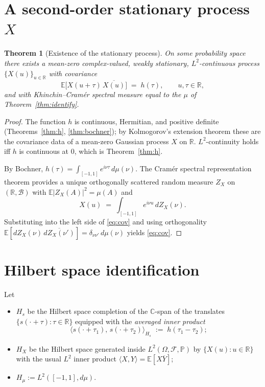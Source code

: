 \documentclass[11pt]{article}
\newtheorem{theorem}{Theorem}
\theoremstyle{definition}
\begin{document}
\section{A second-order stationary process $X$}\label{sec:X}

\begin{theorem}[Existence of the stationary process]\label{thm:X}
On some probability space there exists a mean-zero complex-valued,
weakly stationary, $L^{2}$-continuous process $\{X(u)\}_{u\in\mathbb{R}}$
with covariance
\begin{equation}\label{eq:cov}
\mathbb{E}\bigl[X(u+\tau)\,\overline{X(u)}\bigr] \;=\; h(\tau),
\qquad u,\tau\in\mathbb{R},
\end{equation}
and with Khinchin--Cramér spectral measure equal to the $\mu$ of
Theorem~\ref{thm:identify}.
\end{theorem}

\begin{proof}
The function $h$ is continuous, Hermitian, and positive definite
(Theorems~\ref{thm:h}, \ref{thm:bochner}); by Kolmogorov's extension
theorem these are the covariance data of a mean-zero Gaussian process
$X$ on $\mathbb{R}$. $L^{2}$-continuity holds iff $h$ is continuous at
$0$, which is Theorem~\ref{thm:h}.

By Bochner,
$h(\tau)=\int_{[-1,1]}e^{i\nu\tau}\,d\mu(\nu)$. The Cramér spectral
representation theorem provides a unique orthogonally scattered random
measure $Z_{X}$ on $(\mathbb{R},\mathcal{B})$ with
$\mathbb{E}|Z_{X}(A)|^{2}=\mu(A)$ and
\begin{equation}\label{eq:cramer}
X(u)\;=\;\int_{[-1,1]}e^{i\nu u}\,dZ_{X}(\nu).
\end{equation}
Substituting into the left side of \eqref{eq:cov} and using
orthogonality $\mathbb{E}[dZ_{X}(\nu)\,\overline{dZ_{X}(\nu')}]=\delta_{\nu\nu'}\,d\mu(\nu)$
yields \eqref{eq:cov}.
\end{proof}

\section{Hilbert space identification}\label{sec:hilbert}

Let
\begin{itemize}[leftmargin=1.6em]
\item $H_{s}$ be the Hilbert space completion of the $\mathbb{C}$-span of
the translates $\{s(\cdot+\tau):\tau\in\mathbb{R}\}$ equipped with the
\emph{averaged inner product}
\begin{equation}\label{eq:avginner}
\bigl\langle s(\cdot+\tau_{1}),\,s(\cdot+\tau_{2})\bigr\rangle_{H_{s}}
\;:=\; h(\tau_{1}-\tau_{2});
\end{equation}
\item $H_{X}$ be the Hilbert space generated inside $L^{2}(\Omega,\mathcal{F},\mathbb{P})$
by $\{X(u):u\in\mathbb{R}\}$ with the usual $L^{2}$ inner product
$\langle X,Y\rangle = \mathbb{E}[X\overline{Y}]$;
\item $H_{\mu} := L^{2}([-1,1],d\mu)$.
\end{itemize}
\end{document}
